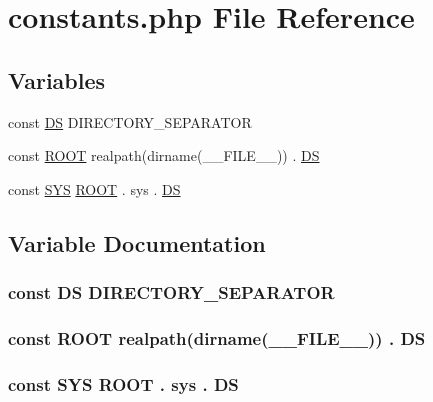 \hypertarget{constants_8php}{}\section{constants.\+php File Reference}
\label{constants_8php}
\subsection*{Variables}
\begin{DoxyCompactItemize}
\item 
const \hyperlink{constants_8php_ae073998f73900b8375397889044c8313}{D\+S} D\+I\+R\+E\+C\+T\+O\+R\+Y\+\_\+\+S\+E\+P\+A\+R\+A\+T\+O\+R
\item 
const \hyperlink{constants_8php_a18c0644836e196aed6d63779e14d6bd8}{R\+O\+O\+T} realpath(dirname(\+\_\+\+\_\+\+F\+I\+L\+E\+\_\+\+\_\+)) . \hyperlink{constants_8php_ae073998f73900b8375397889044c8313}{D\+S}
\item 
const \hyperlink{constants_8php_ad07838f8369ce60156ada55d80c2822b}{S\+Y\+S} \hyperlink{constants_8php_a18c0644836e196aed6d63779e14d6bd8}{R\+O\+O\+T} . \textquotesingle{}sys\textquotesingle{} . \hyperlink{constants_8php_ae073998f73900b8375397889044c8313}{D\+S}
\end{DoxyCompactItemize}


\subsection{Variable Documentation}
\hypertarget{constants_8php_ae073998f73900b8375397889044c8313}{}
\subsubsection[{D\+S}]{\setlength{\rightskip}{0pt plus 5cm}const D\+S D\+I\+R\+E\+C\+T\+O\+R\+Y\+\_\+\+S\+E\+P\+A\+R\+A\+T\+O\+R}\label{constants_8php_ae073998f73900b8375397889044c8313}
\hypertarget{constants_8php_a18c0644836e196aed6d63779e14d6bd8}{}
\subsubsection[{R\+O\+O\+T}]{\setlength{\rightskip}{0pt plus 5cm}const R\+O\+O\+T realpath(dirname(\+\_\+\+\_\+\+F\+I\+L\+E\+\_\+\+\_\+)) . {\bf D\+S}}\label{constants_8php_a18c0644836e196aed6d63779e14d6bd8}
\hypertarget{constants_8php_ad07838f8369ce60156ada55d80c2822b}{}
\subsubsection[{S\+Y\+S}]{\setlength{\rightskip}{0pt plus 5cm}const S\+Y\+S {\bf R\+O\+O\+T} . \textquotesingle{}sys\textquotesingle{} . {\bf D\+S}}\label{constants_8php_ad07838f8369ce60156ada55d80c2822b}
